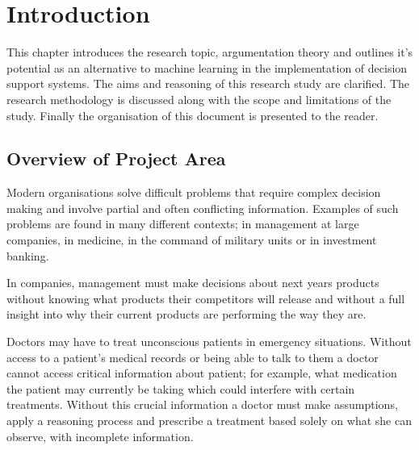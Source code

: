 
\chapter{Introduction} %

\label{Chapter1} %



This chapter introduces the research topic, argumentation theory and outlines it's potential as an alternative to machine learning in the implementation of decision support systems.
The aims and reasoning of this research study are clarified.
The research methodology is discussed along with the scope and limitations of the study.
Finally the organisation of this document is presented to the reader.


\section{Overview of Project Area}

Modern organisations solve difficult problems that require complex decision making and involve partial and often conflicting information. Examples of such problems are found in many different contexts; in management at large companies, in medicine, in the command of military units or in investment banking.

In companies, management must make decisions about next years products without knowing what products their competitors will release and without a full insight into why their current products are performing the way they are.

Doctors may have to treat unconscious patients in emergency situations. Without access to a patient’s medical records or being able to talk to them a doctor cannot access critical information about patient; for example, what medication the patient may currently be taking which could interfere with certain treatments. Without this crucial information a doctor must make assumptions, apply a reasoning process and prescribe a treatment based solely on what she can observe, with incomplete information.

